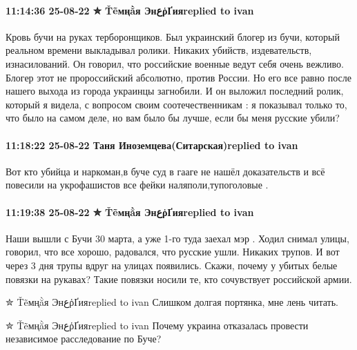  
 
 
 
 

\paragraph{11:14:36 25-08-22 ✮ Ťẽмңằя ЭнعῥҐияreplied to ivan}

Кровь бучи на руках терборонщиков.
Был украинский блогер из бучи, который реальном времени выкладывал ролики. Никаких убийств, издевательств, изнасилований. Он говорил, что российские военные ведут себя очень вежливо. Блогер этот не пророссийский абсолютно, против России. Но его все равно после нашего выхода из города украинцы загнобили. И он выложил последний ролик, который я видела, с вопросом своим соотечественникам : я показывал только то, что было на самом деле, но вам было бы лучше, если бы меня русские убили?

\paragraph{11:18:22 25-08-22 Таня Иноземцева(Ситарская)replied to ivan}

Вот кто убийца и наркоман,в буче суд в гааге не нашёл доказательств и всё
повесили на укрофашистов все фейки наляполи,тупоголовые .

\paragraph{11:19:38 25-08-22 ✮ Ťẽмңằя ЭнعῥҐияreplied to ivan}

Наши вышли с Бучи 30 марта, а уже 1-го туда заехал мэр . Ходил снимал улицы,
говорил, что все хорошо, радовался, что русские ушли. Никаких трупов. И вот
через 3 дня трупы вдруг на улицах появились.
Скажи, почему у убитых белые повязки на рукавах? Такие повязки носили те, кто сочувствует российской армии.

✮ Ťẽмңằя ЭнعῥҐияreplied to ivan
Слишком долгая портянка, мне лень читать.

✮ Ťẽмңằя ЭнعῥҐияreplied to ivan
Почему украина отказалась провести независимое расследование по Буче?
